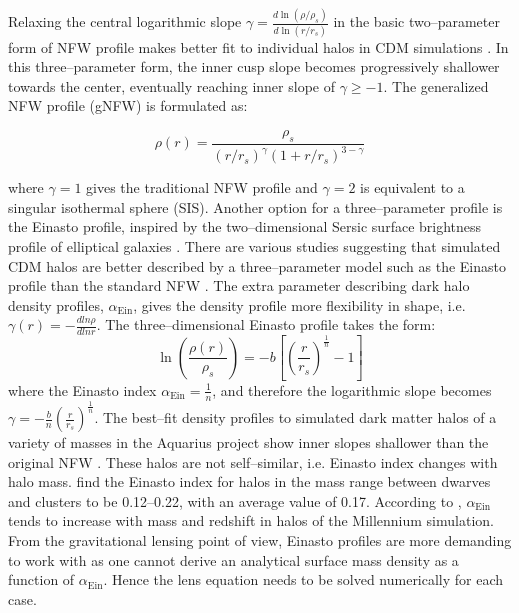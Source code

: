\documentclass[a4wide,12pt]{book}
\begin{document}
Relaxing the central logarithmic slope $\gamma = \frac{d\ln(\rho/\rho_s)}{d\ln(r/r_s)}$ in the basic two--parameter form of NFW profile makes better fit to individual halos in CDM simulations \citep[][]{Stadel+2009, Navarro+2010}. %
 In this three--parameter form, the inner cusp slope becomes progressively shallower towards the center, eventually reaching inner slope of $\gamma\geq-1$. The generalized NFW profile (gNFW) is formulated as:

\begin{equation}
\rho(r) = \frac{\rho_s}{(r / r_s)^\gamma(1 + r/r_s)^{3-\gamma}}
\end{equation}

where $\gamma = 1$ gives the traditional NFW profile and $\gamma = 2$ is equivalent to a singular isothermal sphere (SIS). Another option for a three--parameter profile is the Einasto profile, inspired by the two--dimensional Sersic surface brightness profile of elliptical galaxies \citep[][]{Einasto1965}. There are various studies suggesting that simulated CDM halos are better described by a three--parameter model such as the Einasto profile than the standard NFW \citep[e.g.][]{Navarro+2004, Gao+2008, DiCintio+2014, Dutton.Maccio2014}. The extra parameter describing dark halo density profiles, $\alpha_\mathrm{Ein}$, gives the density profile more flexibility in shape, i.e. $\gamma(r)=-\frac{dln\rho}{dlnr}$. The three--dimensional Einasto profile takes the form:
\begin{equation}
\ln\left(\frac{\rho(r)}{\rho_s}\right) = -b\left[\left(\frac{r}{r_s}\right)^{\frac{1}{n}} - 1\right]
\end{equation}
where the Einasto index $\alpha_\mathrm{Ein} = \frac{1}{n}$, and therefore the logarithmic slope becomes $\gamma = -\frac{b}{n}(\frac{r}{r_s})^\frac{1}{n}$. The best--fit density profiles to simulated dark matter halos of a variety of masses in the Aquarius project show inner slopes shallower than the original NFW \citep{Navarro+2010}. These halos are not self--similar, i.e. Einasto index changes with halo mass. \citet{Navarro+2004} find the Einasto index for halos in the mass range between dwarves and clusters to be 0.12--0.22, with an average value of 0.17. According to \citet{Hayashi.White2008, Gao+2008}, $\alpha_\mathrm{Ein}$ tends to increase with mass and redshift in halos of the Millennium simulation. From the gravitational lensing point of view, Einasto profiles are more demanding to work with as one cannot derive an analytical surface mass density as a function of $\alpha_\mathrm{Ein}$. Hence the lens equation needs to be solved numerically for each case.
\end{document}
